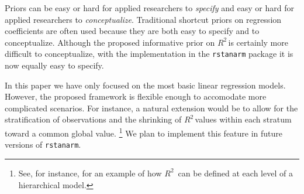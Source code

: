\documentclass[11pt]{article}
\newcommand{\Rsq}{$R^2\,$}
\begin{document}
Priors can be easy or hard for applied researchers to \emph{specify} and easy or
hard for applied researchers to \emph{conceptualize}. Traditional shortcut
priors on regression coefficients are often used because they are both easy to
specify and to conceptualize. Although the proposed informative prior on \Rsq is
certainly more difficult to conceptualize, with the implementation in the
{\tt rstanarm} package it is now equally easy to specify.

In this paper we have only focused on the most basic linear regression models.
However, the proposed framework is flexible enough to accomodate more
complicated scenarios. For instance, a natural extension would be to allow for
the stratification of observations and the shrinking of \Rsq values within each
stratum toward a common global value.%
\footnote{See, for instance,  for an example of how \Rsq
can be defined at each level of a hierarchical model.}
We plan to implement this feature in future versions of {\tt rstanarm}.


\nocite{Rcore}
\nocite{HSAUR3-package}



\end{document}
